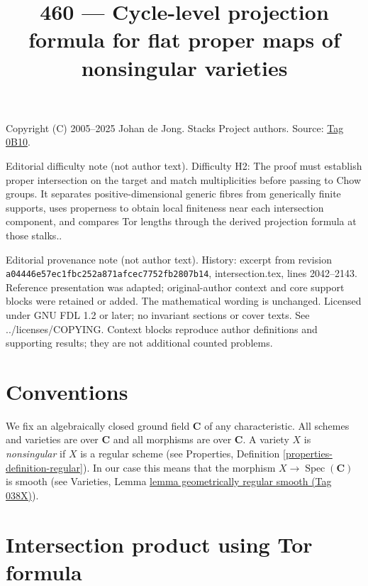 \documentclass{amsart}
\theoremstyle{plain}
\theoremstyle{definition}
\theoremstyle{remark}
\numberwithin{equation}{subsection}
\def\Spec{\mathop{\mathrm{Spec}}}
\begin{document}
\title[Stacks Project, Tag 0B10]{460 --- Cycle-level projection formula for flat proper maps of nonsingular varieties}
\maketitle
\noindent Copyright (C) 2005--2025 Johan de Jong. Stacks Project authors. Source: \href{https://stacks.math.columbia.edu/tag/0B10}{Tag 0B10}.

\noindent Editorial difficulty note (not author text). Difficulty H2: The proof must establish proper intersection on the target and match multiplicities before passing to Chow groups. It separates positive-dimensional generic fibres from generically finite supports, uses properness to obtain local finiteness near each intersection component, and compares Tor lengths through the derived projection formula at those stalks..

\noindent Editorial provenance note (not author text). History: excerpt from revision \texttt{a0444\allowbreak 6e57e\allowbreak c1fbc\allowbreak 252a8\allowbreak 71afc\allowbreak ec775\allowbreak 2fb28\allowbreak 07b14}, intersection.tex, lines 2042--2143. Reference presentation was adapted; original-author context and core support blocks were retained or added. The mathematical wording is unchanged. Licensed under GNU FDL 1.2 or later; no invariant sections or cover texts. See ../licenses/COPYING. Context blocks reproduce author definitions and supporting results; they are not additional counted problems.

\section{Conventions}
\label{section-conventions}

\noindent
We fix an algebraically closed ground field $\mathbf{C}$ of any
characteristic. All schemes and varieties are over $\mathbf{C}$ and all
morphisms are over $\mathbf{C}$. A variety $X$ is
{\it nonsingular} if $X$ is a regular scheme (see
Properties, Definition \ref{properties-definition-regular}).
In our case this means that the morphism $X \to \Spec(\mathbf{C})$
is smooth (see
Varieties, Lemma \href{https://stacks.math.columbia.edu/tag/038X}{lemma geometrically regular smooth (Tag 038X)}).




\section{Intersection product using Tor formula}
\label{section-intersection-product}
\end{document}
